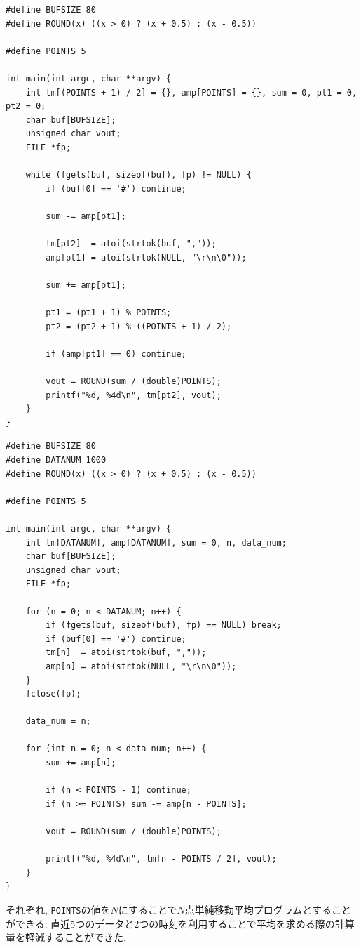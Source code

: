 \documentclass[titlepage]{jsarticle}
\begin{document}
        \begin{lstlisting}[caption=mvave5-1.c, label=src:mvave5-1]
#define BUFSIZE 80
#define ROUND(x) ((x > 0) ? (x + 0.5) : (x - 0.5))

#define POINTS 5

int main(int argc, char **argv) {
    int tm[(POINTS + 1) / 2] = {}, amp[POINTS] = {}, sum = 0, pt1 = 0, pt2 = 0;
    char buf[BUFSIZE];
    unsigned char vout;
    FILE *fp;

    while (fgets(buf, sizeof(buf), fp) != NULL) {
        if (buf[0] == '#') continue;

        sum -= amp[pt1];
        
        tm[pt2]  = atoi(strtok(buf, ","));
        amp[pt1] = atoi(strtok(NULL, "\r\n\0"));

        sum += amp[pt1];

        pt1 = (pt1 + 1) % POINTS;
        pt2 = (pt2 + 1) % ((POINTS + 1) / 2);

        if (amp[pt1] == 0) continue;

        vout = ROUND(sum / (double)POINTS);
        printf("%d, %4d\n", tm[pt2], vout);
    }
}\end{lstlisting}

        \begin{lstlisting}[caption=mvave5-2.c, label=src:mvave5-2]
#define BUFSIZE 80
#define DATANUM 1000
#define ROUND(x) ((x > 0) ? (x + 0.5) : (x - 0.5))

#define POINTS 5

int main(int argc, char **argv) {
    int tm[DATANUM], amp[DATANUM], sum = 0, n, data_num;
    char buf[BUFSIZE];
    unsigned char vout;
    FILE *fp;

    for (n = 0; n < DATANUM; n++) {
        if (fgets(buf, sizeof(buf), fp) == NULL) break;
        if (buf[0] == '#') continue;
        tm[n]  = atoi(strtok(buf, ","));
        amp[n] = atoi(strtok(NULL, "\r\n\0"));
    }
    fclose(fp);

    data_num = n;

    for (int n = 0; n < data_num; n++) {
        sum += amp[n];

        if (n < POINTS - 1) continue;
        if (n >= POINTS) sum -= amp[n - POINTS];

        vout = ROUND(sum / (double)POINTS);

        printf("%d, %4d\n", tm[n - POINTS / 2], vout);
    }
}\end{lstlisting}

        それぞれ, \verb|POINTS|の値を$N$にすることで$N$点単純移動平均プログラムとすることができる.
        直近5つのデータと2つの時刻を利用することで平均を求める際の計算量を軽減することができた.
\end{document}
